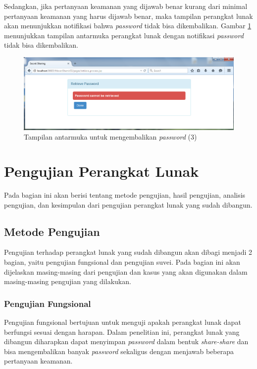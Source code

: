 Sedangkan, jika pertanyaan keamanan yang dijawab benar kurang dari minimal pertanyaan keamanan yang harus dijawab benar, maka tampilan perangkat lunak akan menunjukkan notifikasi bahwa \textit{password} tidak bisa dikembalikan. Gambar \ref{fig:tampilan4_1} menunjukkan tampilan antarmuka perangkat lunak dengan notifikasi \textit{password} tidak bisa dikembalikan.

\begin{figure}[H]
	\includegraphics[scale=0.5]{Gambar/tampilan4_1}
	\centering
	\caption{Tampilan antarmuka untuk mengembalikan \textit{password} (3)}\label{fig:tampilan4_1}
\end{figure}

\section{Pengujian Perangkat Lunak}

Pada bagian ini akan berisi tentang metode pengujian, hasil pengujian, analisis pengujian, dan kesimpulan dari pengujian perangkat lunak yang sudah dibangun.

\subsection{Metode Pengujian}

Pengujian terhadap perangkat lunak yang sudah dibangun akan dibagi menjadi 2 bagian, yaitu pengujian fungsional dan pengujian suvei. Pada bagian ini akan dijelaskan masing-masing dari pengujian dan kasus yang akan digunakan dalam masing-masing pengujian yang dilakukan.

\subsubsection{Pengujian Fungsional}
	
Pengujian fungsional bertujuan untuk menguji apakah perangkat lunak dapat berfungsi sesuai dengan harapan. Dalam penelitian ini, perangkat lunak yang dibangun diharapkan dapat menyimpan \textit{password} dalam bentuk \textit{share-share} dan bisa mengembalikan banyak \textit{password} sekaligus dengan menjawab beberapa pertanyaan keamanan.

